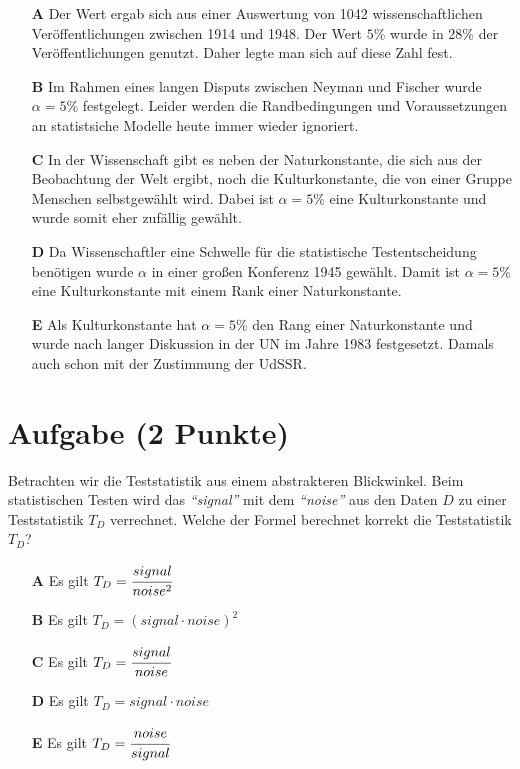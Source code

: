 \documentclass[a4paper, 9pt]{scrartcl}\usepackage[]{graphicx}\usepackage[]{xcolor}
\begin{document}
\begin{enumerate}
\item [\textbf{A} \msquare] Der Wert ergab sich aus einer Auswertung von 1042 wissenschaftlichen Veröffentlichungen zwischen 1914 und 1948. Der Wert $5\%$ wurde in $28\%$ der Veröffentlichungen genutzt. Daher legte man sich auf diese Zahl fest.
\item [\textbf{B} \msquare] Im Rahmen eines langen Disputs zwischen Neyman und Fischer wurde $\alpha = 5\%$ festgelegt. Leider werden die Randbedingungen und Voraussetzungen an statistsiche Modelle heute immer wieder ignoriert.
\item [\textbf{C} \msquare] In der Wissenschaft gibt es neben der Naturkonstante, die sich aus der Beobachtung der Welt ergibt, noch die Kulturkonstante, die von einer Gruppe Menschen selbstgewählt wird. Dabei ist $\alpha = 5\%$ eine Kulturkonstante und wurde somit eher zufällig gewählt.
\item [\textbf{D} \msquare] Da Wissenschaftler eine Schwelle für die statistische Testentscheidung benötigen wurde $\alpha$ in einer großen Konferenz 1945 gewählt. Damit ist $\alpha = 5\%$ eine Kulturkonstante mit einem Rank einer Naturkonstante.
\item [\textbf{E} \msquare] Als Kulturkonstante hat $\alpha = 5\%$ den Rang einer Naturkonstante und wurde nach langer Diskussion in der UN im Jahre 1983 festgesetzt. Damals auch schon mit der Zustimmung der UdSSR.
\end{enumerate}

\section{Aufgabe \hfill (2 Punkte)}

Betrachten wir die Teststatistik aus einem abstrakteren Blickwinkel. Beim
statistischen Testen wird das \textit{"`signal"'} mit dem
\textit{"`noise"'} aus den Daten $D$ zu einer Teststatistik $T_D$ verrechnet. Welche der Formel
berechnet korrekt die Teststatistik $T_D$?



\begin{enumerate}
\item [\textbf{A} \msquare] Es gilt $T_D = \cfrac{signal}{noise^2}$
\item [\textbf{B} \msquare] Es gilt $T_D = (signal \cdot noise)^2$
\item [\textbf{C} \msquare] Es gilt $T_D = \cfrac{signal}{noise}$
\item [\textbf{D} \msquare] Es gilt $T_D = signal \cdot noise$
\item [\textbf{E} \msquare] Es gilt $T_D = \cfrac{noise}{signal}$
\end{enumerate}
\end{document}

